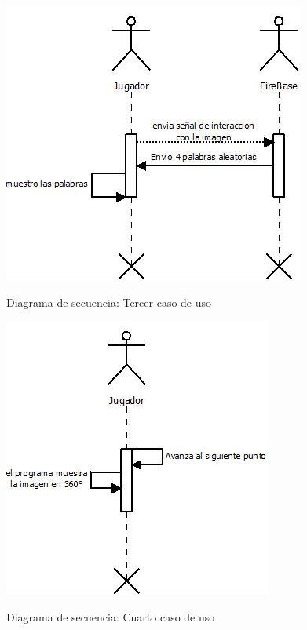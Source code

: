 \begin{figure}[htbp]
\centering
   \includegraphics[scale=0.9]{imgs/DS_3.jpeg}
   \begin{center}
   Diagrama de secuencia: Tercer caso de uso
   \end{center}
\end{figure}

\begin{figure}[htbp]
\centering
   \includegraphics[scale=0.9]{imgs/DS_4.jpeg}
   \begin{center}
   Diagrama de secuencia: Cuarto caso de uso
   \end{center}
\end{figure}

